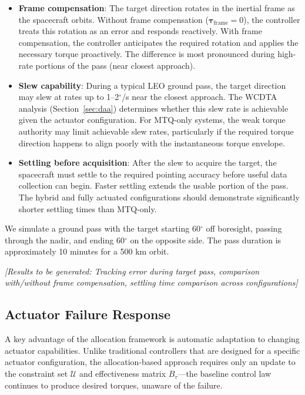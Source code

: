 \documentclass[conference]{IEEEtran}
\begin{document}
\begin{itemize}
    \item \textbf{Frame compensation}: The target direction rotates in the inertial frame as the spacecraft orbits. Without frame compensation ($\boldsymbol{\tau}_{\text{frame}} = 0$), the controller treats this rotation as an error and responds reactively. With frame compensation, the controller anticipates the required rotation and applies the necessary torque proactively. The difference is most pronounced during high-rate portions of the pass (near closest approach).

    \item \textbf{Slew capability}: During a typical LEO ground pass, the target direction may slew at rates up to 1--2$^\circ$/s near the closest approach. The WCDTA analysis (Section~\ref{sec:daa}) determines whether this slew rate is achievable given the actuator configuration. For MTQ-only systems, the weak torque authority may limit achievable slew rates, particularly if the required torque direction happens to align poorly with the instantaneous torque envelope.

    \item \textbf{Settling before acquisition}: After the slew to acquire the target, the spacecraft must settle to the required pointing accuracy before useful data collection can begin. Faster settling extends the usable portion of the pass. The hybrid and fully actuated configurations should demonstrate significantly shorter settling times than MTQ-only.
\end{itemize}

We simulate a ground pass with the target starting 60$^\circ$ off boresight, passing through the nadir, and ending 60$^\circ$ on the opposite side. The pass duration is approximately 10 minutes for a 500 km orbit.

\emph{[Results to be generated: Tracking error during target pass, comparison with/without frame compensation, settling time comparison across configurations]}

\subsection{Actuator Failure Response}
A key advantage of the allocation framework is automatic adaptation to changing actuator capabilities. Unlike traditional controllers that are designed for a specific actuator configuration, the allocation-based approach requires only an update to the constraint set $\mathcal{U}$ and effectiveness matrix $B_\tau$---the baseline control law continues to produce desired torques, unaware of the failure.
\end{document}
